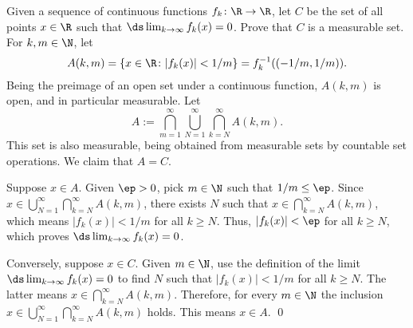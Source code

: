 \begin{hwsol}
Given a sequence of continuous functions $f_k \colon \R \to \R$, let $C$ be the set of all points $x \in \R$ such that $\ds \lim_{k \to \infty} f_k(x)= 0$. Prove that $C$ is a measurable set. \\

\pf For $k, m \in \N$, let 
        \[ 
        A(k, m) = \{ x \in \R \colon |f_k(x)| < 1/m \} = f_k^{-1}((-1/m, 1/m)).
        \]
Being the preimage of an open set under a continuous function, $A(k, m)$ is open, and in particular measurable. Let
        \[
        A:=  \bigcap_{m=1}^\infty \bigcup_{N=1}^\infty \bigcap_{k=N}^\infty A(k, m).
        \]
This set is also measurable, being obtained from measurable sets by countable set operations. We claim that $A=C$. 

Suppose $x \in A$. Given $\ep>0$, pick $m \in \N$ such that $1/m \leq \ep$. Since $x \in \bigcup_{N=1}^\infty \bigcap_{k=N}^\infty A(k, m)$, there exists $N$ such that $x \in \bigcap_{k=N}^\infty A(k, m)$, which means $|f_k(x)|< 1/m$ for all $k \geq N$. Thus, $|f_k(x)|< \ep$ for all $k \geq N$, which proves $\ds\lim_{k \to \infty} f_k(x) = 0$. 

Conversely, suppose $x \in C$. Given $m \in \N$, use the definition of the limit $\ds\lim_{k \to \infty} f_k(x)= 0$ to find $N$ such that $|f_k(x)|< 1/m$ for all $k \geq N$. The latter means $x \in \bigcap_{k=N}^\infty A(k, m)$. Therefore, for every $m \in \N$ the inclusion $x \in \bigcup_{N=1}^\infty \bigcap_{k=N}^\infty A(k, m)$ holds. This means $x \in A$. \qed \\
\end{hwsol}



